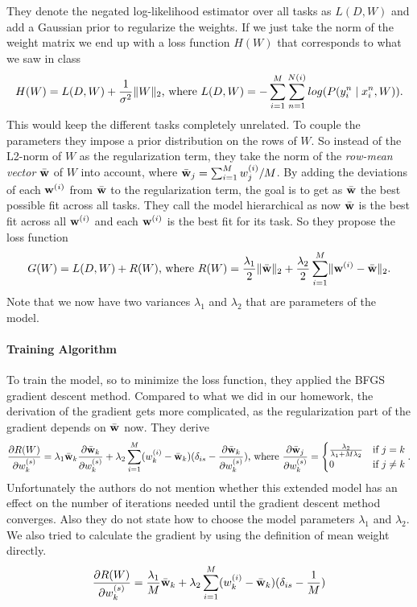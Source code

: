 They denote the negated log-likelihood estimator over all tasks as $L(D,W)$ and add a Gaussian prior to regularize the weights. If we just take the norm of the weight matrix we end up with a loss function $H(W)$ that corresponds to what we saw in class
\begin{align*}
H(W) = L(D,W) + \frac{1}{\sigma^2} \lVert W\rVert_2 \text{, where } L(D,W) = -\sum_{i=1}^{M} \sum_{n=1}^{N(i)} log(P(y_i^n \mid x_i^n, W)).
\end{align*}
This would keep the different tasks completely unrelated. To couple the parameters they impose a prior distribution on the rows of $W$. So instead of the L2-norm of $W$ as the regularization term, they take the norm of the \emph{row-mean vector} $\bar{\textbf{w}}$ of $W$ into account, where $\bar{\textbf{w}}_j = \sum_{i=1}^M w_{j}^{(i)}/M$.
By adding the deviations of each $\textbf{w}^{(i)}$ from $\bar{\textbf{w}}$ to the regularization term, the goal is to get as $\bar{\textbf{w}}$ the best possible fit across all tasks. They call the model hierarchical as now $\bar{\textbf{w}}$ is the best fit across all $\textbf{w}^{(i)}$ and each $\textbf{w}^{(i)}$ is the best fit for its task. So they propose the loss function
\begin{align*}
G(W) = L(D,W) + R(W) \text{, where } R(W) = \frac{\lambda_1}{2} \lVert\bar{\textbf{w}}\rVert_2 + \frac{\lambda_2}{2} \sum_{i=1}^M \lVert\textbf{w}^{(i)} - \bar{\textbf{w}}\rVert_2.
\end{align*}
Note that we now have two variances $\lambda_1$ and $\lambda_2$ that are parameters of the model.

\paragraph{Training Algorithm}
To train the model, so to minimize the loss function, they applied the BFGS gradient descent method. Compared to what we did in our homework, the derivation of the gradient gets more complicated, as the regularization part of the gradient depends on $\bar{\textbf{w}}$ now. They derive
\begin{align*}
\frac{\partial R(W)}{\partial w_k^{(s)}} = \lambda_1 \bar{\textbf{w}}_k\frac{\partial \bar{\textbf{w}}_k}{\partial w_k^{(s)}} + \lambda_2 \sum_{i=1}^{M}(w_k^{(i)} - \bar{\textbf{w}}_k)(\delta_{is} - \frac{\partial\bar{\textbf{w}}_k}{\partial w_k^{(s)}}) \text{, where } \frac{\partial \bar{\textbf{w}}_j}{\partial w_k^{(s)}} = \begin{cases} \frac{\lambda_2}{\lambda_1 + M\lambda_2} & \text{if } j=k\\
0 & \text{if } j\neq k
\end{cases}.
\end{align*}
Unfortunately the authors do not mention whether this extended model has an effect on the number of iterations needed until the gradient descent method converges. Also they do not state how to choose the model parameters $\lambda_1$ and $\lambda_2$.
We also tried to calculate the gradient by using the definition of mean weight directly. 
\begin{align*}
\frac{\partial R(W)}{\partial w_k^{(s)}} = \frac{\lambda_1}{M} \bar{\textbf{w}}_k + \lambda_2 \sum_{i=1}^{M}(w_k^{(i)} - \bar{\textbf{w}}_k)(\delta_{is} - \frac{1}{M})
\end{align*}
